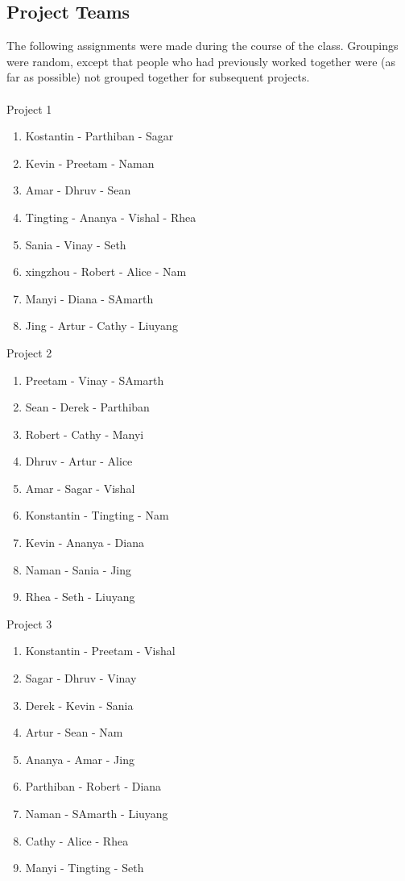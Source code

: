 \subsection{Project Teams}

The following assignments were made during the course of the class. Groupings were random, 
except that people who had previously worked together were (as far as possible) not 
grouped together for subsequent projects.
\\
\\
Project 1
\begin{enumerate}
\item Kostantin - Parthiban - Sagar
\item Kevin - Preetam - Naman
\item Amar - Dhruv - Sean
\item Tingting - Ananya - Vishal - Rhea
\item Sania - Vinay - Seth
\item xingzhou - Robert - Alice - Nam
\item Manyi - Diana - SAmarth
\item Jing - Artur - Cathy - Liuyang
\end{enumerate}
Project 2
\begin{enumerate}
\item Preetam - Vinay - SAmarth
\item Sean - Derek - Parthiban
\item Robert - Cathy - Manyi
\item Dhruv - Artur - Alice
\item Amar - Sagar - Vishal
\item Konstantin - Tingting - Nam
\item Kevin - Ananya - Diana
\item Naman - Sania - Jing
\item Rhea - Seth - Liuyang
\end{enumerate}
Project 3
\begin{enumerate}
\item Konstantin - Preetam - Vishal
\item Sagar - Dhruv - Vinay
\item Derek - Kevin - Sania
\item Artur - Sean - Nam
\item Ananya - Amar - Jing
\item Parthiban - Robert - Diana
\item Naman - SAmarth - Liuyang
\item Cathy - Alice - Rhea
\item Manyi - Tingting - Seth
\end{enumerate}

